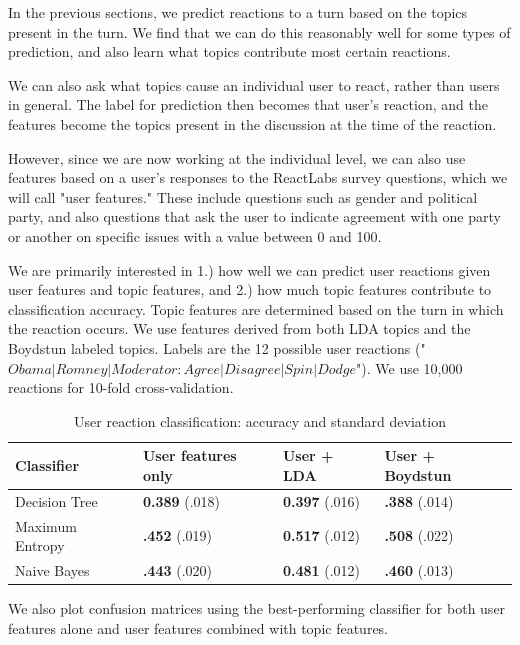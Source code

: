 
In the previous sections, we predict reactions to a turn based on the topics present in the turn. We find that we can do this reasonably well for some types of prediction, and also learn what topics contribute most certain reactions.

We can also ask what topics cause an individual user to react, rather than users in general. The label for prediction then becomes that user's reaction, and the features become the topics present in the discussion at the time of the reaction.

However, since we are now working at the individual level, we can also use features based on a user's responses to the ReactLabs survey questions, which we will call "user features." These include questions such as gender and political party, and also questions that ask the user to indicate agreement with one party or another on specific issues with a value between 0 and 100.

We are primarily interested in 1.) how well we can predict user reactions given user features and topic features, and 2.) how much topic features contribute to classification accuracy. Topic features are determined based on the turn in which the reaction occurs. We use features derived from both LDA topics and the Boydstun labeled topics. Labels are the 12 possible user reactions ("$Obama|Romney|Moderator : Agree|Disagree|Spin|Dodge$"). We use 10,000 reactions for 10-fold cross-validation.

\begin{table}[H]
\begin{centering}
\begin{tabular}{ l | l | l | l }
Classifier & User features only & User + LDA & User + Boydstun \\
\hline
Decision Tree & \textbf{0.389} (.018) & \textbf{0.397} (.016) &  \textbf{.388} (.014) \\
Maximum Entropy & \textbf{.452} (.019) & \textbf{0.517} (.012) &  \textbf{.508} (.022) \\
Naive Bayes & \textbf{.443} (.020) & \textbf{0.481} (.012) &  \textbf{.460} (.013) \\
\end{tabular}
\caption{User reaction classification: accuracy and standard deviation}
\end{centering}
\end{table}

We also plot confusion matrices using the best-performing classifier for both user features alone and user features combined with topic features.

